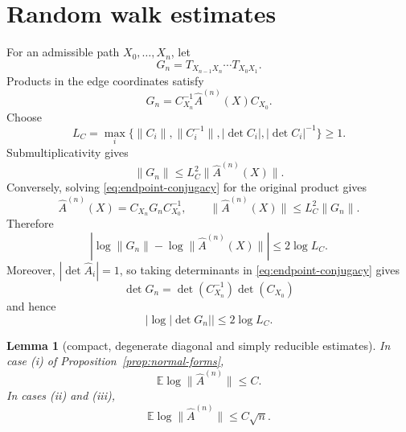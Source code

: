 \documentclass[11pt,a4paper]{amsart}
\newtheorem{lemma}[theorem]{Lemma}
\theoremstyle{definition}
\theoremstyle{remark}
\numberwithin{equation}{section}
\newcommand{\EE}{\mathbb E}
\newcommand{\1}{\boldsymbol 1}
\begin{document}
\section{Random walk estimates}
\label{sec:zero-gap}
For an admissible path $X_0,\ldots,X_n$, let
\begin{equation}\label{eq:edge-product-Gn}
 G_n=T_{X_{n-1}X_n}\cdots T_{X_0X_1}.
\end{equation}
Products in the edge coordinates satisfy
\begin{equation}\label{eq:endpoint-conjugacy}
 G_n
 =C_{X_n}^{-1}\widehat A^{(n)}(X)C_{X_0}.
\end{equation}
Choose
\begin{equation}\label{eq:LC-definition}
 L_C=\max_i\bigl\{
 \|C_i\|,\|C_i^{-1}\|,
 |\det C_i|,|\det C_i|^{-1}
 \bigr\}\ge1.
\end{equation}
Submultiplicativity gives
$$
 \|G_n\|
 \le L_C^2\|\widehat A^{(n)}(X)\|.
$$
Conversely, solving \eqref{eq:endpoint-conjugacy} for the original
product gives
$$
 \widehat A^{(n)}(X)=C_{X_n}G_nC_{X_0}^{-1},
 \qquad
 \|\widehat A^{(n)}(X)\|\le L_C^2\|G_n\|.
$$
Therefore
\begin{equation}\label{eq:endpoint-norm-bound-detailed}
 \left|\log\|G_n\|-
 \log\|\widehat A^{(n)}(X)\|\right|
 \le2\log L_C.
\end{equation}
Moreover, $|\det\widehat A_i|=1$, so taking determinants in
\eqref{eq:endpoint-conjugacy} gives
$$
 \det G_n
 =\det(C_{X_n}^{-1})\det(C_{X_0})
$$
and hence
\begin{equation}\label{eq:endpoint-determinant-bound-detailed}
 |\log|\det G_n||\le2\log L_C.
\end{equation}

\begin{lemma}[compact, degenerate diagonal and simply reducible estimates]
\label{lem:compact-diagonal}
In case \textup{(i)} of Proposition~\ref{prop:normal-forms},
\begin{equation}\label{eq:compact-growth}
 \EE\log\|\widehat A^{(n)}\|\le C.
\end{equation}
In cases \textup{(ii)} and \textup{(iii)},
\begin{equation}\label{eq:diagonal-growth}
 \EE\log\|\widehat A^{(n)}\|\le C\sqrt n.
\end{equation}
\end{lemma}
\end{document}
